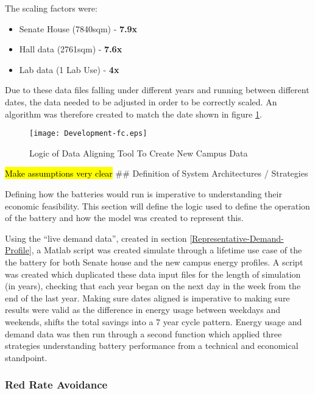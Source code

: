 The scaling factors were:

\begin{itemize}
\tightlist
\item
  Senate House (7840sqm) - \textbf{7.9x}
\item
  Hall data (2761sqm) - \textbf{7.6x}
\item
  Lab data (1 Lab Use) - \textbf{4x}
\end{itemize}

Due to these data files falling under different years and running
between different dates, the data needed to be adjusted in order to be
correctly scaled. An algorithm was therefore created to match the date
shown in figure \ref{Development-fc}.

\begin{figure}[H]
 \centering
 \texttt{[image: Development-fc.eps]}
 \caption{Logic of Data Aligning Tool To Create New Campus Data}
 \label{Development-fc}
 \end{figure}

\hl{Make assumptions very clear} \#\# Definition of System Architectures
/ Strategies

Defining how the batteries would run is imperative to understanding
their economic feasibility. This section will define the logic used to
define the operation of the battery and how the model was created to
represent this.

Using the ``live demand data'', created in section
\ref{Representative-Demand-Profile}, a Matlab script was created
simulate through a lifetime use case of the the battery for both Senate
house and the new campus energy profiles. A script was created which
duplicated these data input files for the length of simulation (in
years), checking that each year began on the next day in the week from
the end of the last year. Making sure dates aligned is imperative to
making sure results were valid as the difference in energy usage between
weekdays and weekends, shifts the total savings into a 7 year cycle
pattern. Energy usage and demand data was then run through a second
function which applied three strategies understanding battery
performance from a technical and economical standpoint.

\subsubsection{Red Rate Avoidance}\label{red-rate-avoidance}


